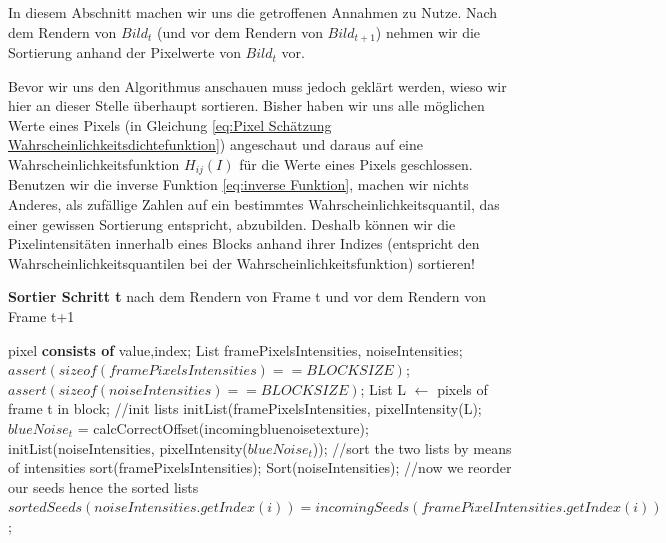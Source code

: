 In diesem Abschnitt machen wir uns die getroffenen  Annahmen 
zu Nutze. Nach dem Rendern von $Bild_{t}$ (und vor dem Rendern von $Bild_{t+1}$) nehmen wir die Sortierung
anhand der Pixelwerte von $Bild_{t}$ vor. 
\par
Bevor wir uns den Algorithmus anschauen muss jedoch geklärt werden, wieso wir hier an dieser Stelle 
überhaupt sortieren. Bisher haben wir uns alle möglichen Werte eines Pixels 
(in Gleichung \ref{eq:Pixel Schätzung Wahrscheinlichkeitsdichtefunktion}) angeschaut und daraus auf
eine Wahrscheinlichkeitsfunktion $H_{ij}(I)$ für die Werte eines Pixels geschlossen. 
Benutzen wir die inverse Funktion \ref{eq:inverse Funktion}, machen wir nichts Anderes, als 
zufällige Zahlen auf ein bestimmtes Wahrscheinlichkeitsquantil, das einer gewissen Sortierung entspricht,
abzubilden. Deshalb können wir die Pixelintensitäten innerhalb eines Blocks anhand ihrer 
Indizes (entspricht den Wahrscheinlichkeitsquantilen bei der Wahrscheinlichkeitsfunktion) 
sortieren! 

\begin{algorithm}[H]
    \caption{\textbf{Sortier Schritt t} nach dem Rendern von Frame t
    und vor dem Rendern von Frame t+1}
    \begin{algorithmic}[1]
        \State pixel \textbf{consists of} value,index;
        \State List framePixelsIntensities, noiseIntensities;
        \State $assert(sizeof(framePixelsIntensities)==BLOCKSIZE)$;
        \State $assert(sizeof(noiseIntensities)==BLOCKSIZE)$;
        \State List L $\leftarrow$ pixels of frame t in block;
        \State \hfill
        \State //init lists
        \State initList(framePixelsIntensities, pixelIntensity(L);
        \State $blueNoise_{t}$ = calcCorrectOffset(incomingbluenoisetexture);
        \State initList(noiseIntensities, pixelIntensity($blueNoise_{t}$));
        \State \hfill
        \State //sort the two lists by means of intensities
        \State sort(framePixelsIntensities);
        \State Sort(noiseIntensities);
        \State \hfill
        \State //now we reorder our seeds hence the sorted lists
        \State $sortedSeeds(noiseIntensities.getIndex(i)) = incomingSeeds(framePixelIntensities.getIndex(i))$;
        \EndFor
    \end{algorithmic}
    \label{alg:Sortier}
\end{algorithm}

